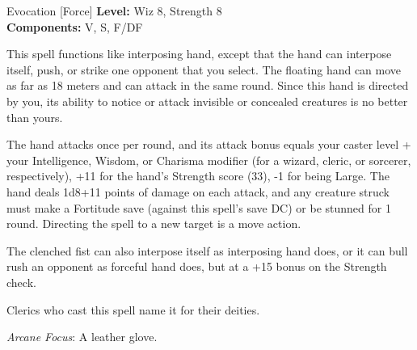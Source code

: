 {Evocation [Force]}
{
	\textbf{Level:}
	Wiz 8, Strength 8\\
	\textbf{Components:}
	V, S, F/DF\\
}
{
	This spell functions like interposing hand, except that the hand can interpose itself, push, or strike one opponent that you select. The floating hand can move as far as 18 meters and can attack in the same round. Since this hand is directed by you, its ability to notice or attack invisible or concealed creatures is no better than yours.

	The hand attacks once per round, and its attack bonus equals your caster level + your Intelligence, Wisdom, or Charisma modifier (for a wizard, cleric, or sorcerer, respectively), +11 for the hand's Strength score (33), -1 for being Large. The hand deals 1d8+11 points of damage on each attack, and any creature struck must make a Fortitude save (against this spell's save DC) or be stunned for 1 round. Directing the spell to a new target is a move action.

	The clenched fist can also interpose itself as interposing hand does, or it can bull rush an opponent as forceful hand does, but at a +15 bonus on the Strength check.

Clerics who cast this spell name it for their deities.

	\textit{Arcane Focus}:
	A leather glove.

}

